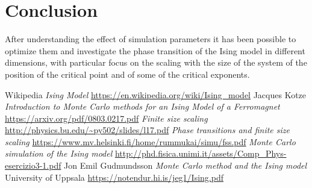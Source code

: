 \documentclass[a4paper, 11pt]{article}
\begin{document}
  \section{Conclusion}
    After understanding the effect of simulation parameters it has been possible to optimize them and investigate the phase transition of the Ising model in different dimensions, with particular focus on the scaling with the size of the system of the position of the critical point and of some of the critical exponents.


































  \begin{thebibliography}{100}
     Wikipedia \emph{Ising Model} \url{https://en.wikipedia.org/wiki/Ising_model}
     Jacques Kotze \emph{Introduction to Monte Carlo methods for an Ising Model of a Ferromagnet} \url{https://arxiv.org/pdf/0803.0217.pdf}
     \emph{Finite size scaling} \url{http://physics.bu.edu/~py502/slides/l17.pdf}
     \emph{Phase transitions and finite size scaling} \url{https://www.mv.helsinki.fi/home/rummukai/simu/fss.pdf}
     \emph{Monte Carlo simulation of the Ising model} \url{http://phd.fisica.unimi.it/assets/Comp_Phys-esercizio3-1.pdf}
     Jon Emil Gudmundsson \emph{Monte Carlo method and the Ising model} University of Uppsala \url{https://notendur.hi.is/jeg1/Ising.pdf}

  \end{thebibliography}
\end{document}
